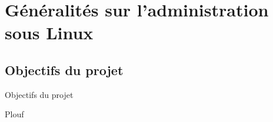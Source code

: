 \section{Généralités sur l'administration sous Linux}

\subsection{Objectifs du projet}
\begin{frame}{Objectifs du projet}

	Plouf
\end{frame}
